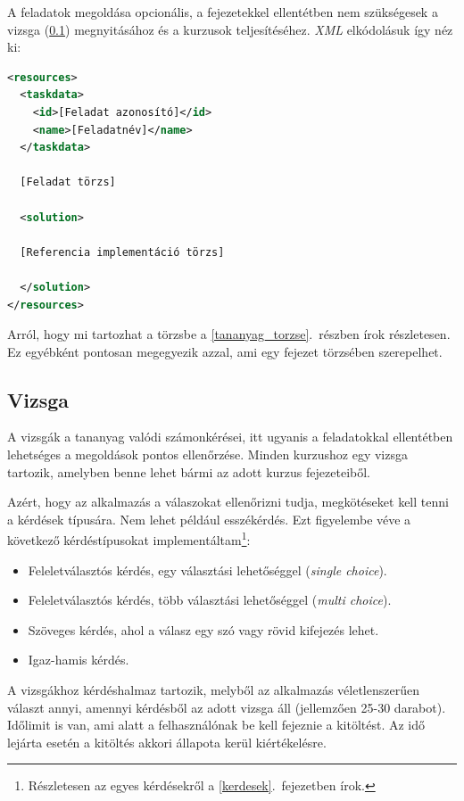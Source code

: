 \documentclass[12pt,a4paper]{article}
\newcommand{\xml}{\textit{XML}\xspace}
\begin{document}
	A feladatok megoldása opcionális, a fejezetekkel ellentétben nem szükségesek a vizsga (\ref{vizsga}) megnyitásához és a kurzusok teljesítéséhez. \xml elkódolásuk így néz ki:
	
	\bigskip
	\begin{lstlisting}[language=XML]
<resources>
  <taskdata>
    <id>[Feladat azonosító]</id>
    <name>[Feladatnév]</name>
  </taskdata>
  
  [Feladat törzs]
  	
  <solution>
  
  [Referencia implementáció törzs]
  
  </solution>
</resources>
	\end{lstlisting}
	\bigskip

	Arról, hogy mi tartozhat a törzsbe a \ref{tananyag_torzse}.\ részben írok részletesen. Ez egyébként pontosan megegyezik azzal, ami egy fejezet törzsében szerepelhet.

	\subsection{Vizsga}\label{vizsga}
	
	A vizsgák a tananyag valódi számonkérései, itt ugyanis a feladatokkal ellentétben lehetséges a megoldások pontos ellenőrzése. Minden kurzushoz egy vizsga tartozik, amelyben benne lehet bármi az adott kurzus fejezeteiből.
	
	Azért, hogy az alkalmazás a válaszokat ellenőrizni tudja, megkötéseket kell tenni a kérdések típusára. Nem lehet például esszékérdés. Ezt figyelembe véve a következő kérdéstípusokat implementáltam\footnote{Részletesen az egyes kérdésekről a \ref{kerdesek}.\ fejezetben írok.}:
	
	\begin{itemize}
		\item Feleletválasztós kérdés, egy választási lehetőséggel (\textit{single choice}).
		\item Feleletválasztós kérdés, több választási lehetőséggel (\textit{multi choice}).
		\item Szöveges kérdés, ahol a válasz egy szó vagy rövid kifejezés lehet.
		\item Igaz-hamis kérdés.
	\end{itemize}
	
	A vizsgákhoz kérdéshalmaz tartozik, melyből az alkalmazás véletlenszerűen választ annyi, amennyi kérdésből az adott vizsga áll (jellemzően 25-30 darabot). Időlimit is van, ami alatt a felhasználónak be kell fejeznie a kitöltést. Az idő lejárta esetén a kitöltés akkori állapota kerül kiértékelésre.
	
\end{document}
